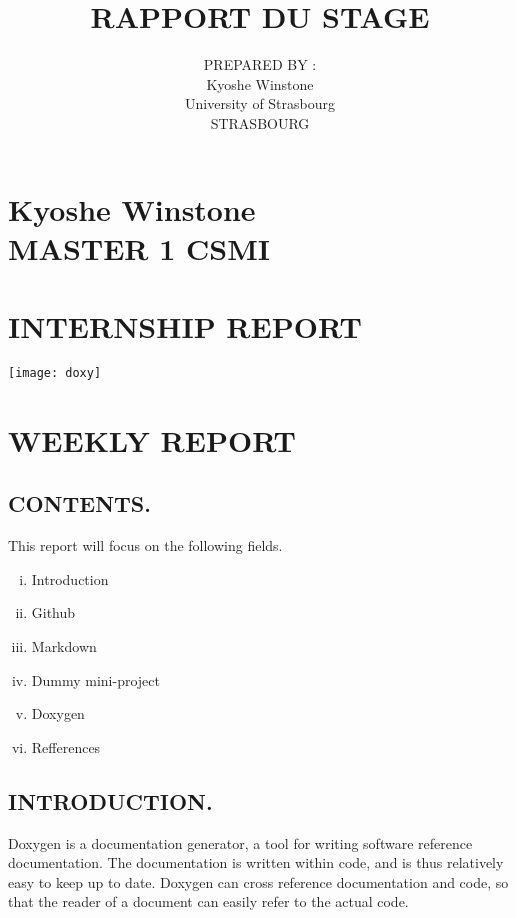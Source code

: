 \documentclass[11pt,utf8]{article}
\title{RAPPORT DU STAGE}
\author{PREPARED BY :\\ Kyoshe Winstone\\University of Strasbourg\\STRASBOURG}
\begin{document}
\begin{center}
\section*{Kyoshe Winstone\\ MASTER 1 CSMI}
\section*{INTERNSHIP REPORT}

\begin{center}
 \texttt{[image: doxy]}
 \end{center}
\section*{WEEKLY REPORT }
\label{weekly report of the internship}

\end{center}



\newpage

\subsection{CONTENTS.}
\label{sec: introduction to github}
This report will focus on the following fields.
\begin{enumerate}[i.]
\item Introduction\\
\item Github\\
\item Markdown\\
\item Dummy mini-project\\
\item Doxygen\\
\item Refferences\\

 \end {enumerate}

\subsection{INTRODUCTION.}
\label{sec: introduction }
Doxygen  is a documentation generator, a tool for writing software reference documentation. The documentation is written within code, and is thus relatively easy to keep up to date. Doxygen can cross reference documentation and code, so that the reader of a document can easily refer to the actual code.\\
\end{document}
